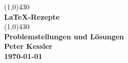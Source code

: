 \begin{center}
  \vspace*{5.5cm}
  \line(1,0){430}\\
  [5mm]
  \Huge\textbf{\LaTeX-Rezepte} \\
  [3mm]
  \line(1,0){430}\\
  \vspace{1.5cm}
  \LARGE\textbf{Problemstellungen und Lösungen}\\
  \vspace{1.5cm}
  \Large\textbf{Peter Kessler}\\  
  \Large\textbf{\today}\\  
  \vfill
\end{center}
